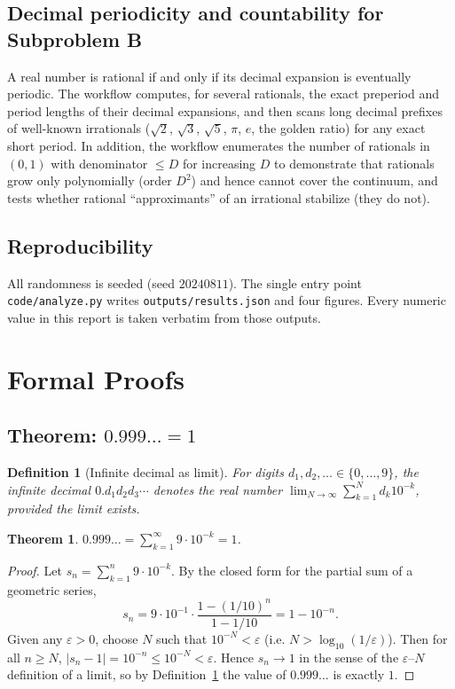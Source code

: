 \documentclass[11pt,a4paper]{article}
\newtheorem{theorem}{Theorem}
\newtheorem{definition}{Definition}
\begin{document}
\subsection{Decimal periodicity and countability for Subproblem B}
A real number is rational if and only if its decimal expansion is eventually
periodic. The workflow computes, for several rationals, the exact preperiod and
period lengths of their decimal expansions, and then scans long decimal prefixes
of well-known irrationals ($\sqrt2$, $\sqrt3$, $\sqrt5$, $\pi$, $e$, the golden
ratio) for any exact short period. In addition, the workflow enumerates the
number of rationals in $(0,1)$ with denominator $\le D$ for increasing $D$ to
demonstrate that rationals grow only polynomially (order $D^2$) and hence cannot
cover the continuum, and tests whether rational ``approximants'' of an
irrational stabilize (they do not).

\subsection{Reproducibility}
All randomness is seeded (seed $20240811$). The single entry point
\texttt{code/analyze.py} writes \texttt{outputs/results.json} and four figures.
Every numeric value in this report is taken verbatim from those outputs.

\section{Formal Proofs}
\label{sec:formal}

\subsection{Theorem: $0.999\ldots = 1$}

\begin{definition}[Infinite decimal as limit]
  For digits $d_1,d_2,\ldots\in\{0,\dots,9\}$, the infinite decimal
  $0.d_1 d_2 d_3\cdots$ denotes the real number
  $\lim_{N\to\infty}\sum_{k=1}^{N} d_k 10^{-k}$, provided the limit exists.
  \label{definition:decimal}
\end{definition}

\begin{theorem}
  $\displaystyle 0.999\ldots = \sum_{k=1}^{\infty} 9\cdot 10^{-k} = 1$.
\end{theorem}

\begin{proof}
Let $s_n=\sum_{k=1}^{n}9\cdot10^{-k}$. By the closed form for the partial sum of
a geometric series,
\begin{equation}
  s_n = 9\cdot 10^{-1}\cdot \frac{1-(1/10)^{n}}{1-1/10}
      = 1 - 10^{-n}.
\end{equation}
Given any $\varepsilon>0$, choose $N$ such that $10^{-N}<\varepsilon$ (i.e.
$N>\log_{10}(1/\varepsilon)$). Then for all $n\ge N$,
$|s_n-1|=10^{-n}\le 10^{-N}<\varepsilon$. Hence $s_n\to 1$ in the sense of the
$\varepsilon$--$N$ definition of a limit, so by
Definition~\ref*{definition:decimal} the value of $0.999\ldots$ is exactly $1$.
\end{proof}
\end{document}
